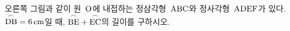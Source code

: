 \noindent\begin{minipage}[t]{0.58\linewidth}\vspace{0pt}\raggedright 오른쪽 그림과 같이 원~$\mathrm{O}$에 내접하는 정삼각형~$\mathrm{ABC}$와 정사각형~$\mathrm{ADEF}$가 있다. $\overset{\frown}{\mathrm{DB}}=6\,\mathrm{cm}$일 때, $\overset{\frown}{\mathrm{BE}}+\overset{\frown}{\mathrm{EC}}$의 길이를 구하시오.\end{minipage}\hfill\begin{minipage}[t]{0.4\linewidth}\vspace{0pt}\centering \resizebox{\ifdim\width>\linewidth\linewidth\else\width\fi}{!}{}\end{minipage}\par
